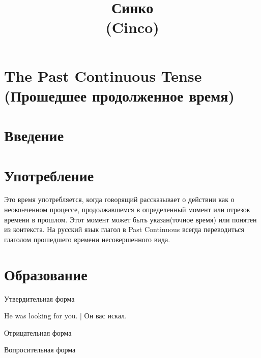 \documentclass{article}
\title{Синко \\(Cinco)}
\begin{document}
\section*{The Past Continuous Tense (Прошедшее продолженное время)}
\section{Введение}

\section{Употребление}
Это время употребляется, когда говорящий рассказывает о действии как о неоконченном процессе, продолжавшемся в определенный момент или отрезок времени в прошлом. Этот момент может быть указан(точное время) или понятен из контекста. На русский язык глагол в Past Continuous всегда переводиться глаголом прошедшего времени несовершенного вида.

\section{Образование}
Утвердительная форма

He was looking for you. | Он вас искал.

Отрицательная форма

Вопросительная форма
\end{document}

